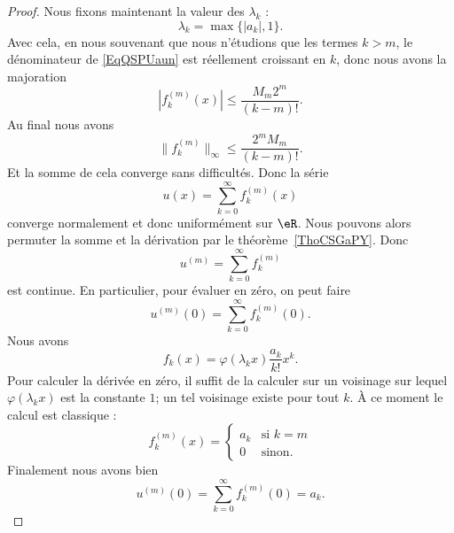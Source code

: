 \begin{proof}
	Nous fixons maintenant la valeur des \( \lambda_k\) :
	\begin{equation}
		\lambda_k=\max\{ | a_k |,1 \}.
	\end{equation}
	Avec cela, en nous souvenant que nous n'étudions que les termes \( k>m\), le dénominateur de \eqref{EqQSPUaun} est réellement croissant en \( k\), donc nous avons la majoration
	\begin{equation}
		| f^{(m)}_k(x) |\leq \frac{ M_m2^m }{ (k-m)! }.
	\end{equation}
	Au final nous avons
	\begin{equation}
		\| f_k^{(m)} \|_{\infty}\leq \frac{ 2^mM_m }{ (k-m)! }.
	\end{equation}
	Et la somme de cela converge sans difficultés. Donc la série
	\begin{equation}
		u(x)=\sum_{k=0}^{\infty}f_k^{(m)}(x)
	\end{equation}
	converge normalement et donc uniformément sur \( \eR\). Nous pouvons alors permuter la somme et la dérivation par le théorème~\ref{ThoCSGaPY}. Donc
	\begin{equation}
		u^{(m)}=\sum_{k=0}^{\infty}f_k^{(m)}
	\end{equation}
	est continue. En particulier, pour évaluer en zéro, on peut faire
	\begin{equation}
		u^{(m)}(0)=\sum_{k=0}^{\infty}f_k^{(m)}(0).
	\end{equation}
	Nous avons
	\begin{equation}
		f_k(x)=\varphi(\lambda_kx)\frac{ a_k }{ k! }x^k.
	\end{equation}
	Pour calculer la dérivée en zéro, il suffit de la calculer sur un voisinage sur lequel \( \varphi(\lambda_kx)\) est la constante \( 1\); un tel voisinage existe pour tout \( k\). À ce moment le calcul est classique :
	\begin{equation}
		f_k^{(m)}(x)=\begin{cases}
			a_k & \text{si } k=m \\
			0   & \text{sinon}.
		\end{cases}
	\end{equation}
	Finalement nous avons bien
	\begin{equation}
		u^{(m)}(0)=\sum_{k=0}^{\infty}f_k^{(m)}(0)=a_k.
	\end{equation}

\end{proof}

